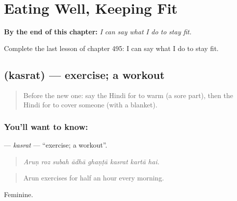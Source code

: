 
\chapter{Eating Well, Keeping Fit}
\label{ch:hi-eating-well-keeping-fit}

\begin{chapteropening}
\textbf{By the end of this chapter:} \emph{I can say what I do to stay fit.}

Complete the last lesson of chapter 495: I can say what I do to stay fit.
\end{chapteropening}

\section[\texorpdfstring{\hi{कसरत} (kasrat)}{कसरत (kasrat)}]{ (kasrat) — exercise; a workout}

\label{lesson:HI-C495-kasrat}



\begin{quote}
Before the new one: say the Hindi for to warm (a sore part), then the Hindi for to cover someone (with a blanket).
\end{quote}

\subsection*{You'll want to know: }
\textbf{} — \emph{kasrat} — \textquotedblleft{}exercise; a workout\textquotedblright{}.

\begin{quote}
       
\end{quote}

\begin{quote}
\emph{Aruṇ roz subah ādhā ghaṇṭā kasrat kartā hai.}
\end{quote}

\begin{quote}
Arun exercises for half an hour every morning.
\end{quote}

Feminine.

